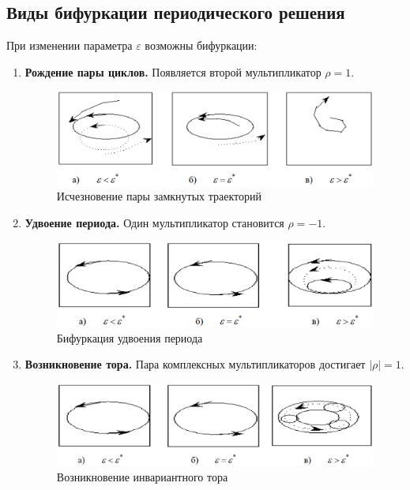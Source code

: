 	\subsection{Виды бифуркации периодического решения}
	
	При изменении параметра \( \varepsilon \) возможны бифуркации:
	
	\begin{enumerate}
		\item \textbf{Рождение пары циклов.} Появляется второй мультипликатор \( \rho = 1 \).
		\begin{figure}[H]
			\centering
			\includegraphics[width=1\linewidth, height=0.15\textheight]{img/14_01}
			{\small Исчезновение пары замкнутых траекторий}
			\label{fig:14_01}
		\end{figure}
		\vspace{-1em}
		\item \textbf{Удвоение периода.} Один мультипликатор становится \( \rho = -1 \).
		\begin{figure}[H]
			\centering
			\includegraphics[width=1\linewidth, height=0.15\textheight]{img/14_02}
			{\small Бифуркация удвоения периода}
			\label{fig:14_02}
		\end{figure}
		\vspace{-1em}
		\item \textbf{Возникновение тора.} Пара комплексных мультипликаторов достигает \( |\rho| = 1 \).
		\begin{figure}[H]
			\centering
			\includegraphics[width=1\linewidth, height=0.15\textheight]{img/14_03}
			{\small Возникновение инвариантного тора}
			\label{fig:14_03}
		\end{figure}
	\end{enumerate}
	\vspace{-2em}
	
